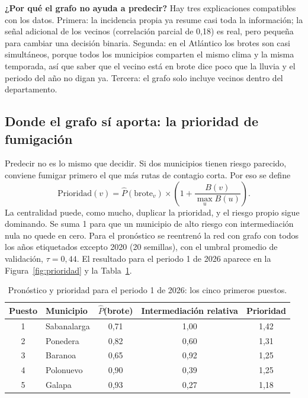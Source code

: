 \documentclass[11pt,letterpaper]{article}
\begin{document}
\noindent\textbf{¿Por qué el grafo no ayuda a predecir?} Hay tres explicaciones compatibles con los datos. Primera: la incidencia propia ya resume casi toda la información; la señal adicional de los vecinos (correlación parcial de 0,18) es real, pero pequeña para cambiar una decisión binaria. Segunda: en el Atlántico los brotes son casi simultáneos, porque todos los municipios comparten el mismo clima y la misma temporada, así que saber que el vecino está en brote dice poco que la lluvia y el periodo del año no digan ya. Tercera: el grafo solo incluye vecinos dentro del departamento.

\subsection{Donde el grafo sí aporta: la prioridad de fumigación}
Predecir no es lo mismo que decidir. Si dos municipios tienen riesgo parecido, conviene fumigar primero el que más rutas de contagio corta. Por eso se define
\begin{equation}
  \text{Prioridad}(v) = \hat P(\text{brote}_v) \times \left(1 + \frac{B(v)}{\max_u B(u)}\right).
\end{equation}
La centralidad puede, como mucho, duplicar la prioridad, y el riesgo propio sigue dominando. Se suma 1 para que un municipio de alto riesgo con intermediación nula no quede en cero. Para el pronóstico se reentrenó la red con grafo con todos los años etiquetados excepto 2020 (20 semillas), con el umbral promedio de validación, $\tau=0{,}44$. El resultado para el periodo 1 de 2026 aparece en la Figura~\ref{fig:prioridad} y la Tabla~\ref{tab:prioridad}.

\begin{table}[H]
\centering\small
\caption{Pronóstico y prioridad para el periodo 1 de 2026: los cinco primeros puestos.}
\label{tab:prioridad}
\begin{tabular}{@{}clccc@{}}
\toprule
Puesto & Municipio & $\hat P$(brote) & Intermediación relativa & Prioridad \\
\midrule
1 & Sabanalarga & 0,71 & 1,00 & 1,42 \\
2 & Ponedera & 0,82 & 0,60 & 1,31 \\
3 & Baranoa & 0,65 & 0,92 & 1,25 \\
4 & Polonuevo & 0,90 & 0,39 & 1,25 \\
5 & Galapa & 0,93 & 0,27 & 1,18 \\
\bottomrule
\end{tabular}
\end{table}
\end{document}
